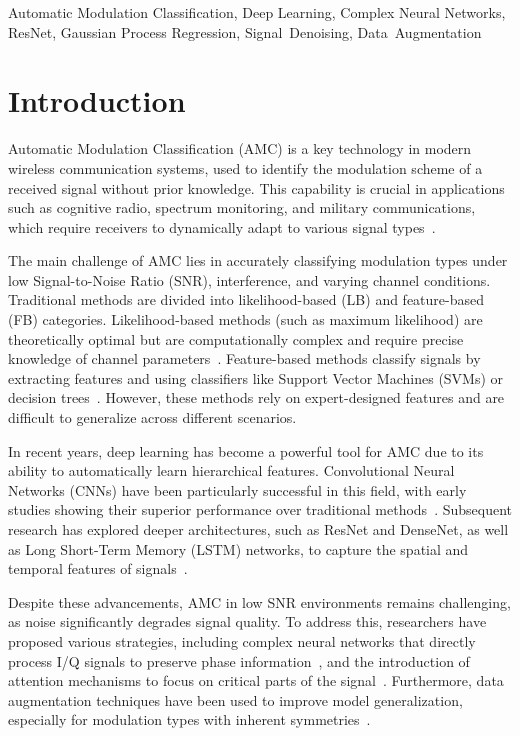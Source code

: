 \documentclass[conference]{IEEEtran}
\begin{document}
\begin{IEEEkeywords}
Automatic Modulation Classification, Deep Learning, Complex Neural Networks, ResNet, Gaussian Process Regression, Signal~Denoising, Data~Augmentation
\end{IEEEkeywords}

\section{Introduction}
Automatic Modulation Classification (AMC) is a key technology in modern wireless communication systems, used to identify the modulation scheme of a received signal without prior knowledge. This capability is crucial in applications such as cognitive radio, spectrum monitoring, and military communications, which require receivers to dynamically adapt to various signal types~\cite{dobre2007survey}.

The main challenge of AMC lies in accurately classifying modulation types under low Signal-to-Noise Ratio (SNR), interference, and varying channel conditions. Traditional methods are divided into likelihood-based (LB) and feature-based (FB) categories. Likelihood-based methods (such as maximum likelihood) are theoretically optimal but are computationally complex and require precise knowledge of channel parameters~\cite{hameed2009likelihood}. Feature-based methods classify signals by extracting features and using classifiers like Support Vector Machines (SVMs) or decision trees~\cite{hazza2013overview}. However, these methods rely on expert-designed features and are difficult to generalize across different scenarios.

In recent years, deep learning has become a powerful tool for AMC due to its ability to automatically learn hierarchical features. Convolutional Neural Networks (CNNs) have been particularly successful in this field, with early studies showing their superior performance over traditional methods~\cite{oshea2016convolutional}. Subsequent research has explored deeper architectures, such as ResNet and DenseNet, as well as Long Short-Term Memory (LSTM) networks, to capture the spatial and temporal features of signals~\cite{west2017deep,rajendran2018deep}.

Despite these advancements, AMC in low SNR environments remains challenging, as noise significantly degrades signal quality. To address this, researchers have proposed various strategies, including complex neural networks that directly process I/Q signals to preserve phase information~\cite{xu2025ldcvnn}, and the introduction of attention mechanisms to focus on critical parts of the signal~\cite{ma2023hfecnetca}. Furthermore, data augmentation techniques have been used to improve model generalization, especially for modulation types with inherent symmetries~\cite{zhang2023efficient}.
\end{document}
